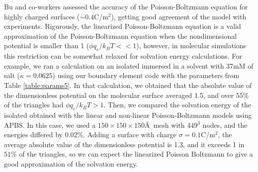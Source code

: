 Bu and co-workers\cite{BuVakninTravesset2006} assessed the accuracy of the Poisson-Boltzmann equation for highly charged surfaces ($\sim 0.4$C/m$^2$), getting good agreement of the model with experiments. 
Rigurously, the linearized Poisson-Boltzmann equation is a valid approximation of the Poisson-Boltzmann equation when the nondimensional potential is smaller than 1 ($\phi q_e/k_BT<<1$), however, in molecular simulations this restriction can be somewhat relaxed for solvation energy calculations. 
For example, we ran a calculation on an isolated  immersed in a solvent with 37mM of salt ($\kappa = 0.0625$) using our boundary element code with the parameters from Table \ref{table:params5}. 
In that calculation, we obtained that the absolute value of the dimensionless potential on the molecular surface averaged 1.5, and over $55\%$ of the triangles had $\phi q_e/k_BT>1$.
Then, we compared the solvation energy of the isolated  obtained with the linear and non-linear Poisson-Boltzmann models using APBS.\cite{BakerETal2001} In this case, we used a $150\times 150\times 150$\AA\ mesh with 449$^3$ nodes, and the energies differed by $0.02\%$.
Adding a surface with charge $\sigma=0.1$C/m$^2$, the average absolute value of the dimensionless potential is 1.3, and it exceeds 1 in $51\%$ of the triangles, so we can expect the linearized Poisson Boltzmann to give a good approximation of the solvation energy.

